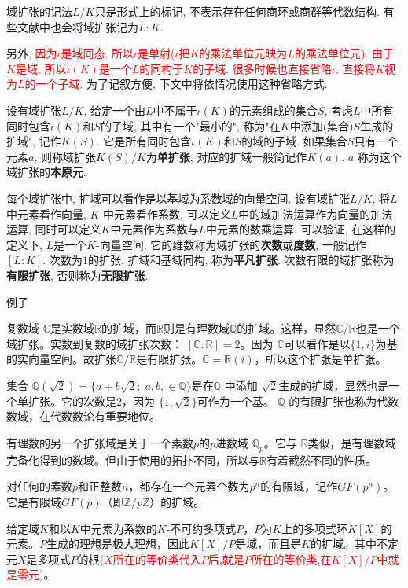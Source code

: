 \documentclass[UTF8]{ctexart}
\begin{document}
\begin{enumerate}
域扩张的记法$L/K$只是形式上的标记, 不表示存在任何商环或商群等代数结构. 有些文献中也会将域扩张记为$L:K$.

另外, \textcolor{red}{因为$\iota$是域同态, 所以$\iota$是单射($\iota$把$K$的乘法单位元映为$L$的乘法单位元). 由于$K$是域, 所以$\iota(K)$是一个$L$的同构于$K$的子域. 很多时候也直接省略$\iota$, 直接将$K$视为$L$的一个子域.} 为了记叙方便, 下文中将依情况使用这种省略方式.

设有域扩张$L/K$, 给定一个由$L$中不属于$\iota(K)$的元素组成的集合$S$, 考虑$L$中所有同时包含$\iota(K)$和$S$的子域, 其中有一个"最小的", 称为"在$K$中添加(集合)$S$生成的扩域", 记作$K(S)$. 它是所有同时包含$\iota(K)$和$S$的域的子域. 如果集合$S$只有一个元素$a$, 则称域扩张$K(S)/K$为\textbf{单扩张}, 对应的扩域一般简记作$K(a)$. $a$ 称为这个域扩张的\textbf{本原元}.

每个域扩张中, 扩域可以看作是以基域为系数域的向量空间. 设有域扩张$L/K$, 将$L$中元素看作向量, $K$ 中元素看作系数, 可以定义$L$中的域加法运算作为向量的加法运算, 同时可以定义$K$中元素作为系数与$L$中元素的数乘运算. 可以验证, 在这样的定义下, $L$是一个$K$-向量空间. 它的维数称为域扩张的\textbf{次数}或\textbf{度数}, 一般记作$[L:K]$. 次数为$1$的扩张, 扩域和基域同构, 称为\textbf{平凡扩张}. 次数有限的域扩张称为\textbf{有限扩张}, 否则称为\textbf{无限扩张}.

例子

复数域 $\mathbb{C}$是实数域$\mathbb{R}$的扩域，而$\mathbb{R}$则是有理数域$\mathbb{Q}$的扩域。这样，显然$\mathbb{C} \big/ \mathbb{R}$也是一个域扩张。实数到复数的域扩张次数： $[\mathbb{C} : \mathbb{R}] = 2$。因为 $\mathbb{C}$可以看作是以$\{1, i\}$为基的实向量空间。故扩张$\mathbb{C} \big/ \mathbb{R}$是有限扩张。$\mathbb{C} = \mathbb{R}(i)$，所以这个扩张是单扩张。

集合 $\mathbb{Q}(\sqrt{2}) = \{ a+ b\sqrt{2} ; \; a, b, \in \mathbb{Q} \}$是在$\mathbb{Q}$ 中添加 $\sqrt{2}$生成的扩域，显然也是一个单扩张。它的次数是$2$，因为 $\{ 1, \sqrt{2}\}$可作为一个基。 $\mathbb{Q}$ 的有限扩张也称为代数数域，在代数数论有重要地位。

有理数的另一个扩张域是关于一个素数$p$的$p$进数域 $\mathbb{Q}_p$。它与 $\mathbb{R}$类似，是有理数域完备化得到的数域。但由于使用的拓扑不同，所以与$\mathbb{R}$有着截然不同的性质。

对任何的素数$p$和正整数$n$，都存在一个元素个数为$p^n$的有限域，记作$GF(p^n)$。它是有限域$GF(p)$（即$\mathbb{Z} \big/ p\mathbb{Z}$）的扩域。

给定域$K$和以$K$中元素为系数的$K$-不可约多项式$P$，$P$为$K$上的多项式环$K[X]$的元素。$P$生成的理想是极大理想，因此$K[X]/P$是域，而且是$K$的扩域。其中不定元$X$是多项式$P$的根\textcolor{red}{($X$所在的等价类代入$P$后,就是$P$所在的等价类,在$K[X]/P$中就是零元)}。


\end{enumerate}
\end{document}
